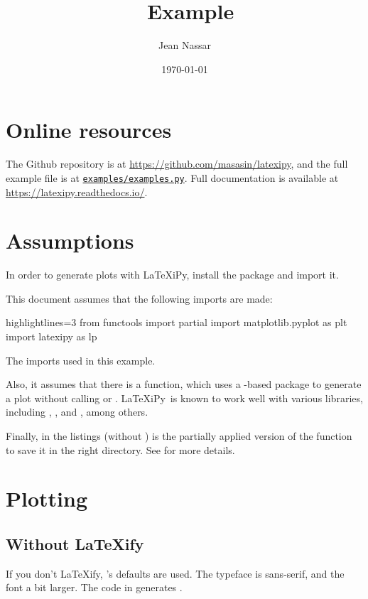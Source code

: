 \documentclass[10pt]{article}
\title{\latexipy\ Example}
\author{Jean Nassar}
\date{\today}
\newcommand\latexipy{\LaTeX iPy}
\newcommand\latexify{\LaTeX ify}
\begin{document}
\maketitle
\tableofcontents
\listoflistings
\listoffigures

\section{Online resources}
The Github repository is at \url{https://github.com/masasin/latexipy},
and the full example file is at \href{https://github.com/masasin/latexipy/blob/master/examples/examples.py}{\texttt{examples/examples.py}}.
Full documentation is available at \url{https://latexipy.readthedocs.io/}.

\section{Assumptions}
In order to generate plots with \latexipy, install the package and import it.

This document assumes that the following imports are made:

\begin{listing}[H]
  \begin{pycode*}{highlightlines=3}
    from functools import partial
    import matplotlib.pyplot as plt
    import latexipy as lp
  \end{pycode*}
  \caption[List of imports]{The imports used in this example.}
  \label{lst:imports}
\end{listing}

Also, it assumes that there is a function,  which uses a -based package to generate a plot without calling  or .
\latexipy\ is known to work well with various libraries, including , ,  and , among others.

Finally,  in the listings (without ) is the partially applied version of the  function to save it in the right directory.
See  for more details.

\section{Plotting}
\subsection{Without \latexify}
If you don't \latexify, 's defaults are used.
The typeface is sans-serif, and the font a bit larger.
The code in  generates .
\end{document}
